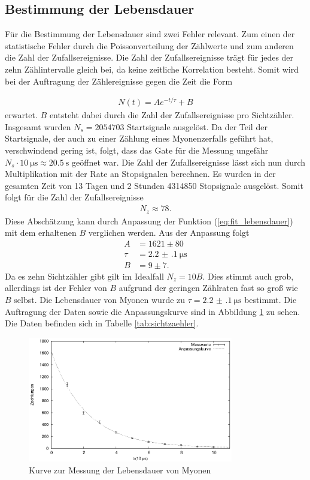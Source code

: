 \subsection{Bestimmung der Lebensdauer}
Für die Bestimmung der Lebensdauer sind zwei Fehler relevant. Zum einen der statistische Fehler durch die Poissonverteilung der Zählwerte und zum anderen die Zahl der Zufallsereignisse. Die Zahl der Zufallsereignisse trägt für jedes der zehn Zählintervalle gleich bei, da keine zeitliche Korrelation besteht. Somit wird bei der Auftragung der Zählereignisse gegen die Zeit die Form

\begin{align}
  N(t)=A e^{-t/\tau}+B
  \label{eq:fit_lebensdauer}
\end{align}
 erwartet. $B$ entsteht dabei durch die Zahl der Zufallsereignisse pro Sichtzähler.
Insgesamt wurden $N_s=2054703$ Startsignale ausgelöst. Da der Teil der Startsignale, der auch zu einer Zählung eines Myonenzerfalls geführt hat, verschwindend gering ist, folgt, dass das Gate für die Messung ungefähr $N_s \cdot \SI{10}{\micro\second}\approx\SI{20.5}{\second}$ geöffnet war. Die Zahl der Zufallsereignisse lässt sich nun durch Multiplikation mit der Rate an Stopsignalen berechnen. Es wurden in der gesamten Zeit von 13 Tagen und 2 Stunden 4314850 Stopsignale ausgelöst. Somit folgt für die Zahl der Zufallsereignisse 
\begin{align*}
  N_z\approx 78.
\end{align*}
Diese Abschätzung kann durch Anpassung der Funktion (\ref{eq:fit_lebensdauer}) mit dem erhaltenen $B$ verglichen werden. Aus der Anpassung folgt
\begin{align*}
  A&=1621 \pm 80\\
  \tau&=\SI[separate-uncertainty = true]{2.2(1)}{\micro\second}\\
  B&=9 \pm 7.
\end{align*}
Da es zehn Sichtzähler gibt gilt im Idealfall $N_z=10B$. Dies stimmt auch grob, allerdings ist der Fehler von $B$ aufgrund der geringen Zählraten fast so groß wie $B$ selbst. Die Lebensdauer von Myonen wurde zu $\tau = \SI[separate-uncertainty = true]{2.2(1)}{\micro\second}$ bestimmt. Die Auftragung der Daten sowie die Anpassungskurve sind in Abbildung \ref{fig:lebensdauer} zu sehen. Die Daten befinden sich in Tabelle \ref{tab:sichtzaehler}.

\begin{figure}[h]
  \centering
  \includegraphics[width=0.8\textwidth]{./data/lebensdauer.eps}
  \caption{Kurve zur Messung der Lebensdauer von Myonen}
  \label{fig:lebensdauer}
\end{figure}


